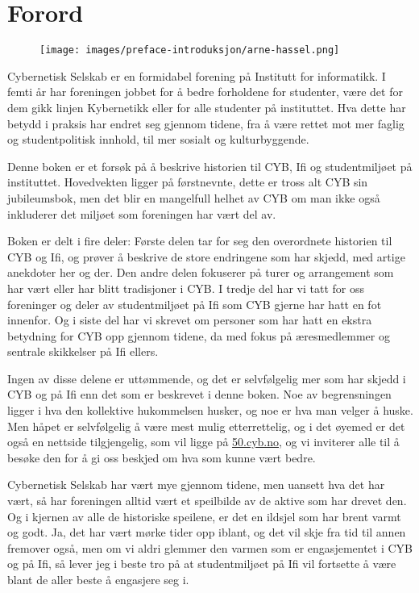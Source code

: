 \chapter*{Forord}

\author{Skrevet av Arne Hassel}

\begin{figure}
	\texttt{[image: images/preface-introduksjon/arne-hassel.png]}
	\label{fig:arne-hassel}
\end{figure}

Cybernetisk Selskab er en formidabel forening på Institutt for informatikk. I femti år har foreningen jobbet for å bedre forholdene for studenter, være det for dem gikk linjen Kybernetikk eller for alle studenter på instituttet. Hva dette har betydd i praksis har endret seg gjennom tidene, fra å være rettet mot mer faglig og studentpolitisk innhold, til mer sosialt og kulturbyggende.

Denne boken er et forsøk på å beskrive historien til CYB, Ifi og studentmiljøet på instituttet. Hovedvekten ligger på førstnevnte, dette er tross alt CYB sin jubileumsbok, men det blir en mangelfull helhet av CYB om man ikke også inkluderer det miljøet som foreningen har vært del av.

Boken er delt i fire deler: Første delen tar for seg den overordnete historien til CYB og Ifi, og prøver å beskrive de store endringene som har skjedd, med artige anekdoter her og der. Den andre delen fokuserer på turer og arrangement som har vært eller har blitt tradisjoner i CYB. I tredje del har vi tatt for oss foreninger og deler av studentmiljøet på Ifi som CYB gjerne har hatt en fot innenfor. Og i siste del har vi skrevet om personer som har hatt en ekstra betydning for CYB opp gjennom tidene, da med fokus på æresmedlemmer og sentrale skikkelser på Ifi ellers.

Ingen av disse delene er uttømmende, og det er selvfølgelig mer som har skjedd i CYB og på Ifi enn det som er beskrevet i denne boken. Noe av begrensningen ligger i hva den kollektive hukommelsen husker, og noe er hva man velger å huske. Men håpet er selvfølgelig å være mest mulig etterrettelig, og i det øyemed er det også en nettside tilgjengelig, som vil ligge på \url{50.cyb.no}, og vi inviterer alle til å besøke den for å gi oss beskjed om hva som kunne vært bedre.

Cybernetisk Selskab har vært mye gjennom tidene, men uansett hva det har vært, så har foreningen alltid vært et speilbilde av de aktive som har drevet den. Og i kjernen av alle de historiske speilene, er det en ildsjel som har brent varmt og godt. Ja, det har vært mørke tider opp iblant, og det vil skje fra tid til annen fremover også, men om vi aldri glemmer den varmen som er engasjementet i CYB og på Ifi, så lever jeg i beste tro på at studentmiljøet på Ifi vil fortsette å være blant de aller beste å engasjere seg i.

